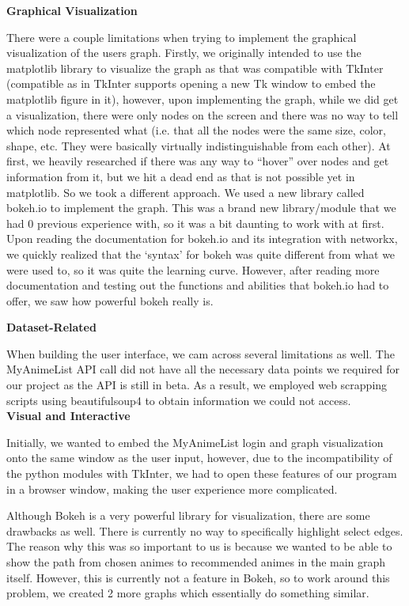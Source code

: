 \documentclass[fontsize=11pt]{article}
\begin{document}
\textbf{Graphical Visualization}

\item[]There were a couple limitations when trying to implement the graphical visualization of the users graph. Firstly, we originally intended to use the matplotlib library to visualize the graph as that was compatible with TkInter (compatible as in TkInter supports opening a new Tk window to embed the matplotlib figure in it), however, upon implementing the graph, while we did get a visualization, there were only nodes on the screen and there was no way to tell which node represented what (i.e. that all the nodes were the same size, color, shape, etc. They were basically virtually indistinguishable from each other). At first, we heavily researched if there was any way to “hover” over nodes and get information from it, but we hit a dead end as that is not possible yet in matplotlib. So we took a different approach. We used a new library called bokeh.io to implement the graph. This was a brand new library/module that we had 0 previous experience with, so it was a bit daunting to work with at first. Upon reading the documentation for bokeh.io and its integration with networkx, we quickly realized that the ‘syntax’ for bokeh was quite different from what we were used to, so it was quite the learning curve. However, after reading more documentation and testing out the functions and abilities that bokeh.io had to offer, we saw how powerful bokeh really is.

\newpage
\textbf{Dataset-Related}

\item[]When building the user interface, we cam across several limitations as well. The MyAnimeList API call did not have all the necessary data points we required for our project as the API is still in beta. As a result, we employed web scrapping scripts using beautifulsoup4 to obtain information we could not access. 
\\
\textbf{Visual and Interactive}

\item[]Initially, we wanted to embed the MyAnimeList login and graph visualization onto the same window as the user input, however, due to the incompatibility of the python modules with TkInter, we had to open these features of our program in a browser window, making the user experience more complicated.

\item[] Although Bokeh is a very powerful library for visualization, there are some drawbacks as well. There is currently no way to specifically highlight select edges. The reason why this was so important to us is because we wanted to be able to show the path from chosen animes to recommended animes in the main graph itself. However, this is currently not a feature in Bokeh, so to work around this problem, we created 2 more graphs which essentially do something similar.
\end{document}
